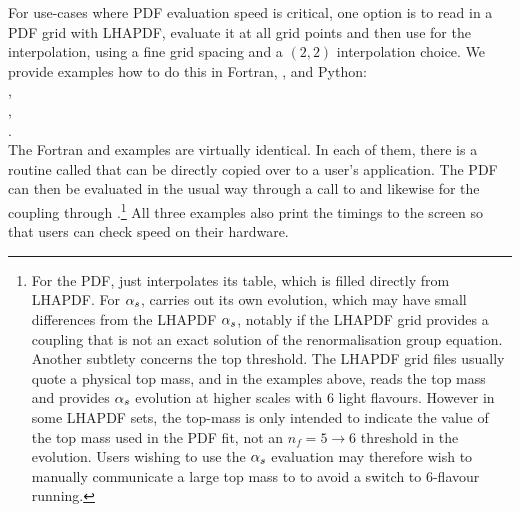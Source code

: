 For use-cases where PDF evaluation speed is critical, one option is
to read in a PDF grid with LHAPDF, evaluate it at all \hoppet grid points and
then use \hoppet for the interpolation, using a fine grid spacing and
a $(2,2)$ interpolation choice.
%
We provide examples how to do this in Fortran, \CPP, and Python:\\[0.2cm]
, \\
, \\
. \\[0.2cm]
%
The Fortran and \CPP examples are virtually identical.
%
In each of them, there is a
routine called  that can be directly
copied over to a user's application.
%
The PDF can then be evaluated in the usual
way through a call to  and likewise for the coupling
through .\footnote{%
  For the PDF, \hoppet just
  interpolates its table, which is filled directly from LHAPDF.
  For $\alpha_s$, \hoppet carries out its own evolution, which may have
  small differences from the LHAPDF $\alpha_s$, notably if the LHAPDF grid
  provides a coupling that is not an exact solution of the renormalisation
  group equation.
  Another subtlety concerns the top threshold.
  The LHAPDF grid files usually quote a physical top mass, and in the
  examples above, \hoppet reads the top mass and provides $\alpha_s$
  evolution at higher scales with $6$ light flavours.
  However in some LHAPDF sets, the top-mass is only intended to
  indicate the value of the top mass used in the PDF fit, not an $n_f = 5
  \to 6$ threshold in the evolution.
  Users wishing to use the \hoppet $\alpha_s$ evaluation may therefore wish
  to manually communicate a large top mass to \hoppet to avoid a
  switch to $6$-flavour running.
}
%
All three examples also print the timings to the screen so that users
can check speed on their hardware.

